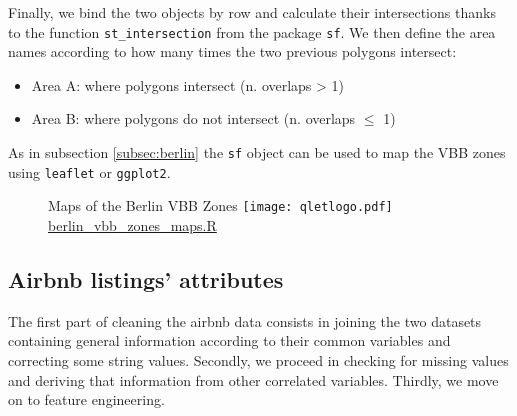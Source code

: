Finally, we bind the two objects by row and calculate their intersections thanks to the function \texttt{st\_intersection} from the package \texttt{sf}. We then define the area names according to how many times the two previous polygons intersect:
	\begin{itemize}
    		\item Area A: where polygons intersect (n. overlaps > 1)
    		\item Area B: where polygons do not intersect (n. overlaps $\leq$ 1)
    \end{itemize}



\iffalse
In this code the custom-function \texttt{points\_midpoint} was used to calculate the middle point among many. It extracts the coordinates of the points thanks to \texttt{st\_coordinates} and then calculates the mean of latitude and longitude.


\fi

As in subsection \ref{subsec:berlin} the \texttt{sf} object can be used to map the VBB zones using \texttt{leaflet} or \texttt{ggplot2}.

\begin{figure}[H]
\centering
{}
\caption{Maps of the Berlin VBB Zones \protect\texttt{[image: qletlogo.pdf]} {\href{https://github.com/silvia-ventoruzzo/SPL-WISE-2018/blob/master/Berlin_VBB_Zones/berlin_vbb_zones_maps.R}{berlin\_vbb\_zones\_maps.R}}}
\centering
\end{figure}

\subsection{Airbnb listings' attributes}\label{subsec:airbnb}

The first part of cleaning the airbnb data consists in joining the two datasets containing general information according to their common variables and correcting some string values. Secondly, we proceed in checking for missing values and deriving that information from other correlated variables. Thirdly, we move on to feature engineering.

